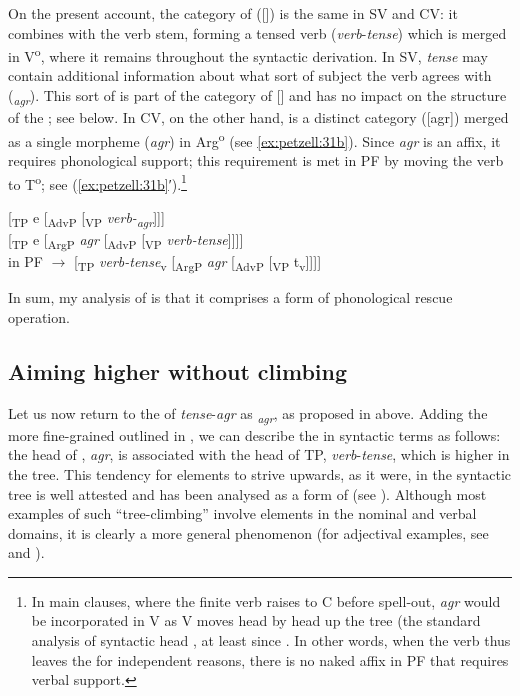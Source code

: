 \documentclass[output=paper,colorlinks,citecolor=brown,draft,draftmode]{langscibook}
\begin{document}
On the present account, the category of  ([]) is the same in SV and CV: it combines with the verb stem, forming a tensed verb (\textit{verb}-\textit{tense}) which is merged in V\textsuperscript{o}, where it remains throughout the syntactic derivation. In SV, \textit{tense} may contain additional information about what sort of subject the verb agrees with (\textit{\textsubscript{agr}}). This sort of  is part of the category of [] and has no impact on the structure of the ; see  below. In CV, on the other hand,  is a distinct category ([agr]) merged as a single morpheme (\textit{agr}) in Arg\textsuperscript{o} (see \ref{ex:petzell:31b}). Since \textit{agr} is an affix, it requires phonological support; this requirement is met in PF by moving the verb to T\textsuperscript{o}; see (\ref{ex:petzell:31b}′).\footnote{In
    main clauses, where the finite verb raises to C before spell-out, \textit{agr} would be incorporated in V as V moves head by head up the tree (the standard analysis of syntactic head , at least since \citet{Chomsky2001}. In other words, when the verb thus leaves the  for independent reasons, there is no naked affix in PF that requires verbal support.
}


\ea\label{ex:petzell:31}
\ea\label{ex:petzell:31a}  [\textsubscript{TP} e [\textsubscript{AdvP} [\textsubscript{VP} \textit{verb-\textsubscript{agr}}]]]\\
\ex\label{ex:petzell:31b}   [\textsubscript{TP} e [\textsubscript{ArgP} \textit{agr} [\textsubscript{AdvP} [\textsubscript{VP} \textit{verb-tense}]]]]  \\
  in PF $\to$ [\textsubscript{TP} \textit{verb-tense}\textsubscript{v} [\textsubscript{ArgP} \textit{agr} [\textsubscript{AdvP} [\textsubscript{VP} t\textsubscript{v}]]]]
\z
\z


In sum, my analysis of  is that it comprises a form of phonological rescue operation.


\subsection{Aiming higher without climbing}\label{sec:petzell:5.2}


Let us now return to the  of \textit{tense}-\textit{agr} as \textit{\textsubscript{agr}}, as proposed in  above. Adding the more fine-grained  outlined in , we can describe the  in syntactic terms as follows: the head of , \textit{agr}, is associated with the head of TP, \textit{verb}-\textit{tense}, which is higher in the tree. This tendency for elements to strive upwards, as it were, in the syntactic tree is well attested and has been analysed as a form of  (see \citealt{RobertsRoussou1999,RobertsRoussou2003}). Although most examples of such “tree-climbing” involve elements in the nominal and verbal domains, it is clearly a more general phenomenon (for adjectival examples, see \citealt{Oxford2017} and ).
\end{document}
